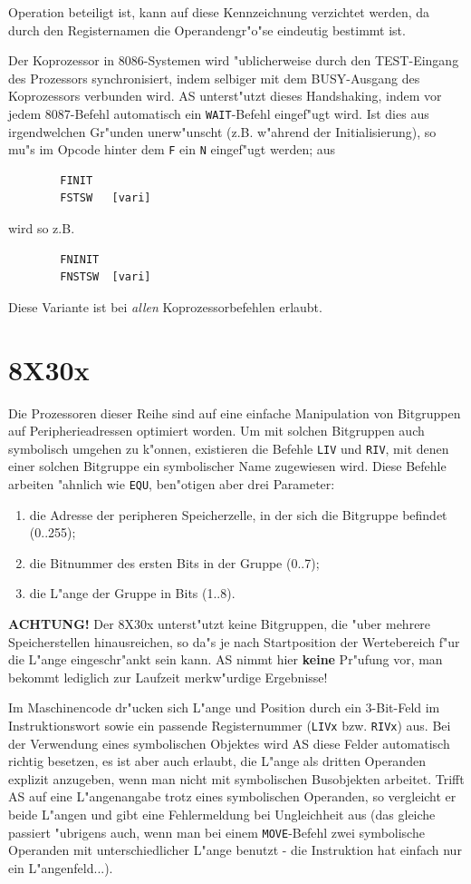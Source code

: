 \documentclass[12pt,a4paper,twoside]{report}
\newcommand{\ii}[1]{{\it #1}}
\newcommand{\bb}[1]{{\bf #1}}
\newcommand{\tty}[1]{{\tt #1}}
\newcommand{\asname}{AS}
\begin{document}
Operation beteiligt ist, kann auf diese Kennzeichnung verzichtet werden, da
durch den Registernamen die Operandengr"o"se eindeutig bestimmt ist.
\par
Der Koprozessor in 8086-Systemen wird "ublicherweise durch den TEST-Eingang
des Prozessors synchronisiert, indem selbiger mit dem BUSY-Ausgang des
Koprozessors verbunden wird.  \asname{} unterst"utzt dieses Handshaking, indem
vor jedem 8087-Befehl automatisch ein \tty{WAIT}-Befehl eingef"ugt wird.  Ist
dies aus irgendwelchen Gr"unden unerw"unscht (z.B. w"ahrend der
Initialisierung), so mu"s im Opcode hinter dem \tty{F} ein \tty{N} eingef"ugt
werden; aus
\begin{verbatim}
        FINIT
        FSTSW   [vari]
\end{verbatim}
wird so z.B.
\begin{verbatim}
        FNINIT
        FNSTSW  [vari]
\end{verbatim}
Diese Variante ist bei \ii{allen} Koprozessorbefehlen erlaubt.


\section{8X30x}
\label{8X30xSpec}

Die Prozessoren dieser Reihe sind auf eine einfache Manipulation von
Bitgruppen auf Peripherieadressen optimiert worden.  Um mit solchen
Bitgruppen auch symbolisch umgehen zu k"onnen, existieren die Befehle
\tty{LIV} und \tty{RIV}, mit denen einer solchen Bitgruppe ein
symbolischer Name zugewiesen wird.  Diese Befehle arbeiten "ahnlich
wie \tty{EQU}, ben"otigen aber drei Parameter:
\begin{enumerate}
\item{die Adresse der peripheren Speicherzelle, in der sich die
      Bitgruppe befindet (0..255);}
\item{die Bitnummer des ersten Bits in der Gruppe (0..7);}
\item{die L"ange der Gruppe in Bits (1..8).}
\end{enumerate}
\bb{ACHTUNG!}  Der 8X30x unterst"utzt keine Bitgruppen, die "uber mehrere
Speicherstellen hinausreichen, so da"s je nach Startposition der
Wertebereich f"ur die L"ange eingeschr"ankt sein kann.  \asname{} nimmt hier
\bb{keine} Pr"ufung vor, man bekommt lediglich zur Laufzeit merkw"urdige
Ergebnisse!

Im Maschinencode dr"ucken sich L"ange und Position durch ein 3-Bit-Feld
im Instruktionswort sowie ein passende Registernummer (\tty{LIVx} bzw.
\tty{RIVx}) aus.  Bei der Verwendung eines symbolischen Objektes wird \asname{}
diese Felder automatisch richtig besetzen, es ist aber auch erlaubt,
die L"ange als dritten Operanden explizit anzugeben, wenn man nicht
mit symbolischen Busobjekten arbeitet.  Trifft \asname{} auf eine L"angenangabe
trotz eines symbolischen Operanden, so vergleicht er beide L"angen
und gibt eine Fehlermeldung bei Ungleichheit aus (das gleiche passiert
"ubrigens auch, wenn man bei einem \tty{MOVE}-Befehl zwei symbolische
Operanden mit unterschiedlicher L"ange benutzt - die Instruktion hat
einfach nur ein L"angenfeld...).
\end{document}
